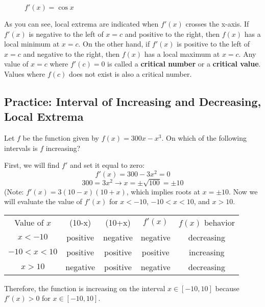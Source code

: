 \begin{figure}
	\centering
	\caption{$f'(x) = \cos{x}$}
	\label{fig:fprimecos}
\end{figure}


As you can see, local extrema are indicated when $f'(x)$ crosses the x-axis. 
If $f'(x)$ is negative to the left of $x=c$ and positive to the right, then 
$f(x)$ has a local minimum at $x=c$. On the other hand, if $f'(x)$ is positive 
to the left of $x=c$ and negative to the right, then $f(x)$ has a local 
maximum at $x=c$. Any value of $x=c$ where $f'(c) = 0$ is called a \textbf{
critical number} or a \textbf{critical value}. Values where $f(c)$ does not 
exist is also a critical number. 

\subsection{Practice: Interval of Increasing and Decreasing, Local Extrema}
\begin{Exercise}
    [label=incdec1]
    Let $f$ be the function given by $f(x) = 300x-x^3$. On which of the 
    following intervals is $f$ increasing?
\end{Exercise}

\begin{Answer}
    [ref=incdec1]
    First, we will find $f'$ and set it equal to zero: $$f'(x) = 300 - 3x^2 = 
    0$$ $$300=3x^2 \rightarrow x=\pm \sqrt{100} = \pm10$$ (Note: $f'(x) = 3(10 
    - x)(10 + x)$, which implies roots at $x=\pm10$. Now we will evaluate the 
    value of $f'(x)$ for $x < -10$, $-10 < x < 10$, and $ x >10$. 
    \begin{center}
        \begin{tabular}{c|c|c|c|c}
        Value of $x$ & (10-x) & (10+x) & $f'(x)$ & $f(x)$ behavior\\
         $x<-10$    &  positive & negative& negative & decreasing\\
         $-10<x<10$    & positive & positive& positive& increasing\\
         $x>10$ & negative & positive & negative & decreasing
        \end{tabular}
    \end{center}
    Therefore, the function is increasing on the interval $x \in [-10, 10]$ 
    because $f'(x) >0$ for $x \in [-10, 10]$.
\end{Answer}

